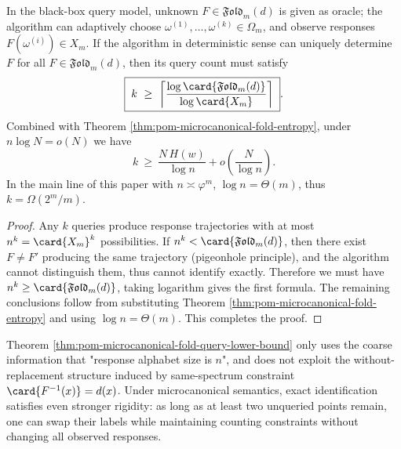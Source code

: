 \begin{theorem}\label{thm:pom-microcanonical-fold-query-lower-bound}
In the black-box query model, unknown \(F\in\mathfrak{Fold}_m(d)\) is given as oracle; the algorithm can adaptively choose
\(\omega^{(1)},\dots,\omega^{(k)}\in\Omega_m\), and observe responses \(F(\omega^{(i)})\in X_m\).
If the algorithm in deterministic sense can uniquely determine \(F\) for all \(F\in\mathfrak{Fold}_m(d)\), then its query count must satisfy
\[
\boxed{\;
k\ \ge\ \left\lceil \frac{\log\card{\mathfrak{Fold}_m(d)}}{\log\card{X_m}}\right\rceil\; } .
\]
Combined with Theorem \ref{thm:pom-microcanonical-fold-entropy}, under \(n\log N=o(N)\) we have
\[
k\ \ge\ \frac{N\,H(w)}{\log n}+o\!\left(\frac{N}{\log n}\right).
\]
In the main line of this paper with \(n\asymp\varphi^m\), \(\log n=\Theta(m)\), thus \(k=\Omega(2^m/m)\).
\end{theorem}
\begin{proof}
Any \(k\) queries produce response trajectories with at most \(n^k=\card{X_m}^k\) possibilities.
If \(n^k<\card{\mathfrak{Fold}_m(d)}\), then there exist \(F\neq F'\) producing the same trajectory (pigeonhole principle), and the algorithm cannot distinguish them, thus cannot identify exactly.
Therefore we must have \(n^k\ge \card{\mathfrak{Fold}_m(d)}\), taking logarithm gives the first formula.
The remaining conclusions follow from substituting Theorem \ref{thm:pom-microcanonical-fold-entropy} and using \(\log n=\Theta(m)\). This completes the proof.
\end{proof}

\begin{remark}
Theorem \ref{thm:pom-microcanonical-fold-query-lower-bound} only uses the coarse information that "response alphabet size is \(n\)",
and does not exploit the without-replacement structure induced by same-spectrum constraint \(\card{F^{-1}(x)}=d(x)\).
Under microcanonical semantics, exact identification satisfies even stronger rigidity: as long as at least two unqueried points remain, one can swap their labels while maintaining counting constraints without changing all observed responses.
\end{remark}

